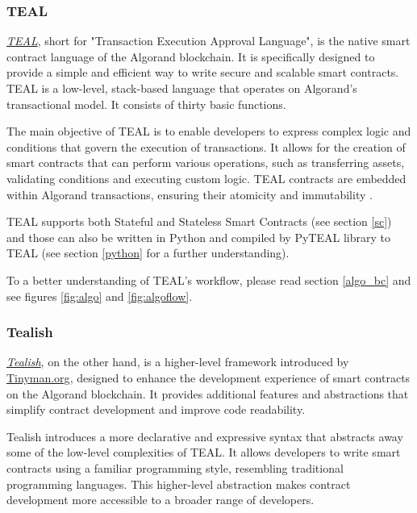 \subsubsection{TEAL}

\href{https://developer.algorand.org/docs/get-details/dapps/avm/teal/}{\textit{TEAL}}, short for "Transaction Execution Approval Language", is the native smart contract language of the Algorand blockchain. It is specifically designed to provide a simple and efficient way to write secure and scalable smart contracts. TEAL is a low-level, stack-based language that operates on Algorand's transactional model. It consists of thirty basic functions.\newline

The main objective of TEAL is to enable developers to express complex logic and conditions that govern the execution of transactions. It allows for the creation of smart contracts that can perform various operations, such as transferring assets, validating conditions and executing custom logic. TEAL contracts are embedded within Algorand transactions, ensuring their atomicity and immutability \cite{teal, teal_2}.\newline

TEAL supports both Stateful and Stateless Smart Contracts (see section \ref{sc}) and those can also be written in Python and compiled by PyTEAL library to TEAL (see section \ref{python} for a further understanding).\newline

To a better understanding of TEAL's workflow, please read section \ref{algo_bc} and see figures \ref{fig:algo} and \ref{fig:algoflow}.

\subsubsection{Tealish}

\href{https://github.com/tinymanorg/tealish}{\textit{Tealish}}, on the other hand, is a higher-level framework introduced by \href{https://tinyman.org}{Tinyman.org}, designed to enhance the development experience of smart contracts on the Algorand blockchain. It provides additional features and abstractions that simplify contract development and improve code readability.\newline

Tealish introduces a more declarative and expressive syntax that abstracts away some of the low-level complexities of TEAL. It allows developers to write smart contracts using a familiar programming style, resembling traditional programming languages. This higher-level abstraction makes contract development more accessible to a broader range of developers.\newline

